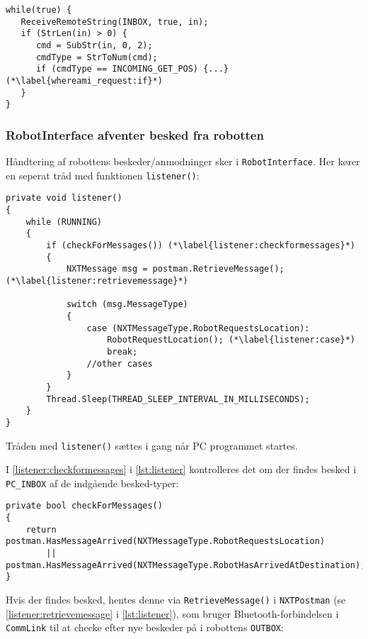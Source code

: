 \begin{lstlisting}[style=csmall,label=lst:whereami_response,caption=Robotten venter på svar]
while(true) {
   ReceiveRemoteString(INBOX, true, in);
   if (StrLen(in) > 0) {
      cmd = SubStr(in, 0, 2);
      cmdType = StrToNum(cmd);
      if (cmdType == INCOMING_GET_POS) {...} (*\label{whereami_request:if}*)
   }
}
\end{lstlisting}

\subsubsection{RobotInterface afventer besked fra robotten}
Håndtering af robottens beskeder/anmodninger sker i \lstinline[style=csharp]!RobotInterface!.
Her kører en seperat tråd med funktionen \lstinline[style=csharp]!listener()!:

\begin{lstlisting}[style=csharpsmall,label=lst:listener,caption=listener() i RobotInterface]
private void listener()
{
    while (RUNNING)
    {
        if (checkForMessages()) (*\label{listener:checkformessages}*)
        {
            NXTMessage msg = postman.RetrieveMessage(); (*\label{listener:retrievemessage}*)

            switch (msg.MessageType)
            {
                case (NXTMessageType.RobotRequestsLocation):
                    RobotRequestLocation(); (*\label{listener:case}*)
                    break;
                //other cases
            }
        }
        Thread.Sleep(THREAD_SLEEP_INTERVAL_IN_MILLISECONDS);
    }
}
\end{lstlisting}

Tråden med \lstinline[style=csharp]!listener()! sættes i gang når PC programmet startes.

I \cref{listener:checkformessages} i \cref{lst:listener} kontrolleres det om der findes besked i \lstinline[style=csharp]!PC_INBOX! af de indgående besked-typer:

\begin{lstlisting}[style=csharpsmall,label=lst:checkformessages,caption=checkForMessages() i RobotInterface]
private bool checkForMessages()
{
    return postman.HasMessageArrived(NXTMessageType.RobotRequestsLocation)
        || postman.HasMessageArrived(NXTMessageType.RobotHasArrivedAtDestination);
}
\end{lstlisting}

Hvis der findes besked, hentes denne via \lstinline[style=csharp]!RetrieveMessage()! i \lstinline[style=csharp]!NXTPostman! (se \cref{listener:retrievemessage} i \cref{lst:listener}), som bruger Bluetooth-forbindelsen i \lstinline[style=csharp]!CommLink! til at checke efter nye beskeder på i robottens \lstinline[style=c]!OUTBOX!:

